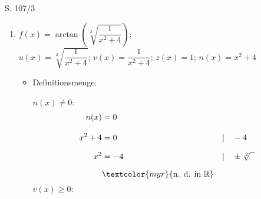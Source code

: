 \begin{Exercise}{S. 107/3}{}
\begin{enumerate}
\begin{enumerate}[label=\alph*),leftmargin=*]
{\begin{itemize}[leftmargin=*]
{{
                    }
                    }
            \end{itemize}
            }
        \item[h)] {
            $f(x) = \arctan\left(\sqrt[2]{\dfrac{1}{x^{2}+4}}\right)$; \\[1.5ex]
            $u(x) = \sqrt[2]{\dfrac{1}{x^{2}+4}}$; \qquad $v(x) = \dfrac{1}{x^{2}+4}$; \qquad $z(x) = 1$; \qquad $n(x) = x^{2}+4$ \\[-2.0ex]
            \begin{itemize}[leftmargin=*]
                \item Definitionsmenge: \\[1.0ex]{
                    \begin{minipage}[t]{0.5\linewidth}
                        $n(x) \neq 0:$\\[-4.0ex]
                        \begin{align*}
                            n(x) &= 0 &&\\[2.0ex]
                            x^{2} + 4 &= 0 &&| \quad -4\\[1.5ex]
                            x^{2} &= -4 &&| \quad \pm \sqrt[2]{\phantom{x}}\\[1.5ex]
                            & \textcolor{myr}{\text{n. d. in } \mathbb{R}}\\[-1.5ex]
                        \end{align*}
                    \end{minipage}
                    \begin{minipage}[t]{0.5\linewidth}
                        $v(x) \geq 0:$\\[-4.0ex]
                        \begin{align*}

\end{align*}
\end{minipage}}
\end{itemize}}
\end{enumerate}
\end{enumerate}
\end{Exercise}
